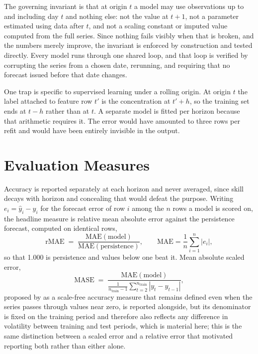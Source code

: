 \documentclass[12pt,a4paper]{report}
\begin{document}
The governing invariant is that at origin $t$ a model may use observations up to
and including day $t$ and nothing else: not the value at $t+1$, not a parameter
estimated using data after $t$, and not a scaling constant or imputed value
computed from the full series. Since nothing fails visibly when that is broken,
and the numbers merely improve, the invariant is enforced by construction and
tested directly. Every model runs through one shared loop, and that loop is
verified by corrupting the series from a chosen date, rerunning, and requiring
that no forecast issued before that date changes.

One trap is specific to supervised learning under a rolling origin. At origin $t$
the label attached to feature row $t'$ is the concentration at $t' + h$, so the
training set ends at $t - h$ rather than at $t$. A separate model is fitted per
horizon because that arithmetic requires it. The error would have amounted to
three rows per refit and would have been entirely invisible in the output.

\section{Evaluation Measures}
\label{sec:evalmeasures}

Accuracy is reported separately at each horizon and never averaged, since skill
decays with horizon and concealing that would defeat the purpose. Writing
$e_i = \hat y_i - y_i$ for the forecast error of row $i$ among the $n$ rows a
model is scored on, the headline measure is relative mean absolute error
against the persistence forecast, computed on identical rows,
\begin{equation}
\mathrm{rMAE} \;=\; \frac{\mathrm{MAE}(\text{model})}{\mathrm{MAE}(\text{persistence})},
\qquad \mathrm{MAE} = \frac{1}{n}\sum_{i=1}^{n}|e_i|,
\label{eq:rmae}
\end{equation}
so that 1.000 is persistence and values below one beat it. Mean absolute
scaled error,
\begin{equation}
\mathrm{MASE} \;=\; \frac{\mathrm{MAE}(\text{model})}
{\frac{1}{n_{\text{train}}-1}\sum_{t=2}^{n_{\text{train}}}|y_t - y_{t-1}|},
\label{eq:mase}
\end{equation}
proposed by \citet{hyndman2006mase} as a scale-free
accuracy measure that remains defined even when the series passes through
values near zero, is reported alongside, but its denominator is fixed on the
training period and therefore also reflects any difference in volatility
between training and test periods, which is material here; this is the same
distinction between a scaled error and a relative error that motivated
reporting both rather than either alone.
\end{document}
